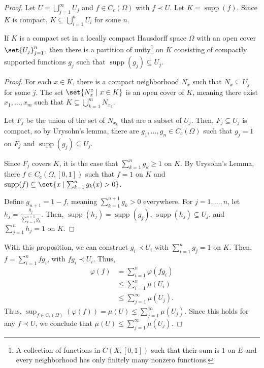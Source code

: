 \documentclass[10pt]{mypackage}
\DeclareMathOperator{\supp}{supp}
\begin{document}
\begin{proof}
  Let $U = \bigcup_{j=1}^{\infty}U_j$ and $f\in C_c\left(\Omega\right)$ with $f\prec U$. Let $K = \supp\left(f\right)$. Since $K$ is compact, $K\subseteq \bigcup_{i=1}^{n}U_i$ for some $n$.
  \begin{proposition}
    If $K$ is a compact set in a locally compact Hausdorff space $\Omega$ with an open cover $\set{U_j}_{j=1}^{n}$, then there is a partition of unity\footnote{A collection of functions in $C\left(X,[0,1]\right)$ such that their sum is $1$ on $E$ and every neighborhood has only finitely many nonzero functions.} on $K$ consisting of compactly supported functions $g_j$ such that $\supp\left(g_j\right)\subseteq U_j$.
  \end{proposition}
  \begin{proof}
    For each $x\in K$, there is a compact neighborhood $N_x$ such that $N_x\subseteq U_j$ for some $j$. The set $\set{N_x^{\circ}\mid x\in K}$ is an open cover of $K$, meaning there exist $x_1,\dots,x_m$ such that $K\subseteq \bigcup_{k=1}^{m}N_{x_k}$.\newline

    Let $F_j$ be the union of the set of $N_{x_k}$ that are a subset of $U_j$. Then, $F_j\subseteq U_j$ is compact, so by Urysohn's lemma, there are $g_1,\dots,g_n\in C_c\left(\Omega\right)$ such that $g_j = 1$ on $F_j$ and $\supp\left(g_j\right) \subseteq U_j$.\newline

    Since $F_j$ covers $K$, it is the case that $\sum_{k=1}^{n}g_k \geq 1$ on $K$. By Urysohn's Lemma, there $f\in C_c\left(\Omega,[0,1]\right)$ such that $f = 1$ on $K$ and $\supp(f) \subseteq \set{x\mid \sum_{k=1}^{n}g_k(x) > 0}$.\newline

    Define $g_{n+1} = 1 - f$, meaning $\sum_{k=1}^{n+1}g_{k} > 0$ everywhere. For $j = 1,\dots,n$, let $h_j = \frac{g_j}{\sum_{k=1}^{n+1}g_k}$. Then, $\supp\left(h_j\right) = \supp\left(g_j\right)$, $\supp\left(h_j\right) \subseteq U_j$, and $\sum_{j=1}^{n}h_j = 1$ on $K$.
  \end{proof}
  With this proposition, we can construct $g_i \prec U_i$ with $\sum_{i=1}^{n}g_j = 1$ on $K$. Then, $f = \sum_{i=1}^{n}fg_i$, with $fg_i\prec U_i$. Thus,
  \begin{align*}
    \varphi(f) &= \sum_{i=1}^{n}\varphi\left(fg_i\right)\\
               &\leq \sum_{i=1}^{n}\mu\!\left(U_i\right)\\
               &\leq \sum_{j=1}^{\infty}\mu\!\left(U_j\right).
  \end{align*}
  Thus, $\sup_{f\in C_c\left(\Omega\right)}\left(\varphi(f)\right) = \mu\!\left(U\right) \leq \sum_{j=1}^{\infty}\mu\!\left(U_j\right)$. Since this holds for any $f\prec U$, we conclude that $\mu\!\left(U\right) \leq \sum_{j=1}^{\infty}\mu\!\left(U_j\right)$.\newline


\end{proof}
\end{document}
